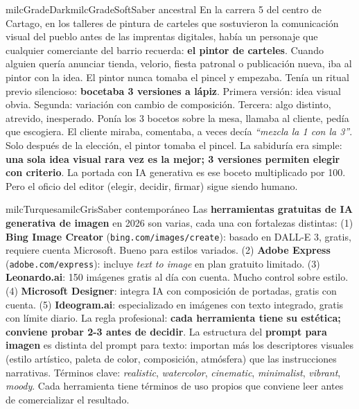 \documentclass[11pt,letterpaper]{article}
\begin{document}
\begin{softbox}{milcGradeDark}{milcGradeSoft}{Saber ancestral}
En la carrera 5 del centro de Cartago, en los talleres de pintura de carteles que sostuvieron la comunicación visual del pueblo antes de las imprentas digitales, había un personaje que cualquier comerciante del barrio recuerda: \textbf{el pintor de carteles}. Cuando alguien quería anunciar tienda, velorio, fiesta patronal o publicación nueva, iba al pintor con la idea. El pintor nunca tomaba el pincel y empezaba. Tenía un ritual previo silencioso: \textbf{bocetaba 3 versiones a lápiz}. Primera versión: idea visual obvia. Segunda: variación con cambio de composición. Tercera: algo distinto, atrevido, inesperado. Ponía los 3 bocetos sobre la mesa, llamaba al cliente, pedía que escogiera. El cliente miraba, comentaba, a veces decía \emph{``mezcla la 1 con la 3''}. Solo después de la elección, el pintor tomaba el pincel. La sabiduría era simple: \textbf{una sola idea visual rara vez es la mejor; 3 versiones permiten elegir con criterio}. La portada con IA generativa es ese boceto multiplicado por 100. Pero el oficio del editor (elegir, decidir, firmar) sigue siendo humano.
\end{softbox}

\begin{softbox}{milcTurquesa}{milcGris}{Saber contemporáneo}
Las \textbf{herramientas gratuitas de IA generativa de imagen} en 2026 son varias, cada una con fortalezas distintas: (1) \textbf{Bing Image Creator} (\texttt{bing.com/images/create}): basado en DALL-E 3, gratis, requiere cuenta Microsoft. Bueno para estilos variados. (2) \textbf{Adobe Express} (\texttt{adobe.com/express}): incluye \emph{text to image} en plan gratuito limitado. (3) \textbf{Leonardo.ai}: 150 imágenes gratis al día con cuenta. Mucho control sobre estilo. (4) \textbf{Microsoft Designer}: integra IA con composición de portadas, gratis con cuenta. (5) \textbf{Ideogram.ai}: especializado en imágenes con texto integrado, gratis con límite diario. La regla profesional: \textbf{cada herramienta tiene su estética; conviene probar 2-3 antes de decidir}. La estructura del \textbf{prompt para imagen} es distinta del prompt para texto: importan más los descriptores visuales (estilo artístico, paleta de color, composición, atmósfera) que las instrucciones narrativas. Términos clave: \emph{realistic}, \emph{watercolor}, \emph{cinematic}, \emph{minimalist}, \emph{vibrant}, \emph{moody}. Cada herramienta tiene términos de uso propios que conviene leer antes de comercializar el resultado.
\end{softbox}
\end{document}
